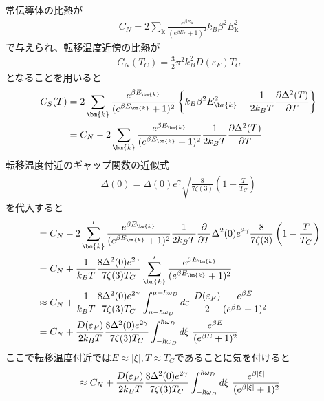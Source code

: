 \documentclass[dvipdfmx, 11pt, a4paper]{jsarticle}
\numberwithin{equation}{section}
\theoremstyle{definition}
\begin{document}
    \begin{derivationBox}
        常伝導体の比熱が
        \begin{align}
            C_N = 2\sum_{\bm{k}}  \frac{e^{\beta E_{\bm{k}}}}{(e^{\beta E_{\bm{k}}}+1)^2} k_B \beta^2 E_{\bm{k}}^2 
        \end{align}
        で与えられ、転移温度近傍の比熱が
        \begin{align}
            C_N(T_C) = \frac{3}{2} \pi^2k_B^2D(\varepsilon_F) T_C
        \end{align}
        となることを用いると
        \begin{align}
            C_S(T) &= 2\sum_{\bm{k}}  \frac{e^{\beta E_{\bm{k}}}}{(e^{\beta E_{\bm{k}}}+1)^2} \left\{ k_B \beta^2 E_{\bm{k}}^2 - \frac{1}{2k_B T} 
            \frac{\partial \Delta^2(T)}{\partial T}   \right\} \notag \\
            &= C_N -2\sum_{\bm{k}} \frac{e^{\beta E_{\bm{k}}}}{(e^{\beta E_{\bm{k}}}+1)^2} \frac{1}{2k_BT} \frac{\partial \Delta^2(T)}{\partial T} 
        \end{align}
        転移温度付近のギャップ関数の近似式
        \begin{align}
            \Delta(0) = \Delta(0) e^\gamma \sqrt{\frac{8}{7\zeta(3)}\left( 1 - \frac{T}{T_C} \right)}
        \end{align}
        を代入すると
        \begin{align}
            &= C_N -2\sum_{\bm{k}}' \frac{e^{\beta E_{\bm{k}}}}{(e^{\beta E_{\bm{k}}}+1)^2} \frac{1}{2k_BT} \frac{\partial}{\partial T} \Delta^2(0)e^{2\gamma} \frac{8}{7\zeta(3)}\left( 1 - \frac{T}{T_C} \right) \notag \\
            &= C_N + \frac{1}{k_BT}\frac{8\Delta^2(0)e^{2\gamma}}{7\zeta(3)T_C} \sum_{\bm{k}}' \frac{e^{\beta E_{\bm{k}}}}{(e^{\beta E_{\bm{k}}}+1)^2} \notag \\
            &\approx C_N + \frac{1}{k_BT}\frac{8\Delta^2(0)e^{2\gamma}}{7\zeta(3)T_C} \int_{\mu-\hbar \omega_D}^{\mu + \hbar \omega_D} d\varepsilon\ \frac{D(\varepsilon_F)}{2} \frac{e^{\beta E}}{(e^{\beta E}+1)^2} \notag \\
            &= C_N + \frac{D(\varepsilon_F)}{2k_BT}\frac{8\Delta^2(0)e^{2\gamma}}{7\zeta(3)T_C} \int_{-\hbar \omega_D}^{ \hbar \omega_D} d\xi\  \frac{e^{\beta E}}{(e^{\beta E}+1)^2}
        \end{align}
        ここで転移温度付近では$E \approx |\xi|, T\approx T_C$であることに気を付けると
        \begin{align}
            &\approx C_N + \frac{D(\varepsilon_F)}{2k_BT}\frac{8\Delta^2(0)e^{2\gamma}}{7\zeta(3)T_C} \int_{-\hbar \omega_D}^{ \hbar \omega_D} d\xi\  \frac{e^{\beta |\xi|}}{(e^{\beta |\xi|}+1)^2} \notag \\

\end{align}
\end{derivationBox}
\end{document}
